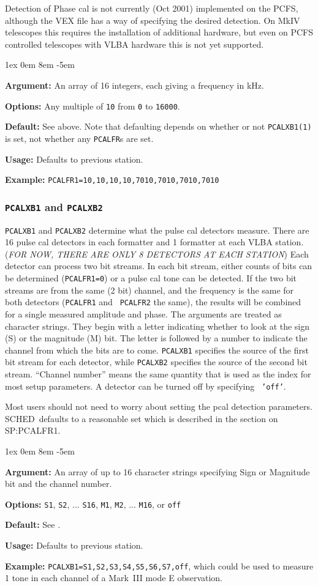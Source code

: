 \documentclass{report}
\newcommand{\schedb}{{\sc SCHED~}}
\newcommand{\rcwbox}[5]{
  \begin{list}{}{\parsep 1ex  \itemsep 0em
                 \leftmargin 8em  \itemindent -5em }
    \item {\bf Argument:} #1
    \item {\bf Options:}  #2
    \item {\bf Default:}  #3
    \item {\bf Usage:}    #4
    \item {\bf Example:}  #5
  \end{list}
}
\begin{document}
Detection of Phase cal is not currently (Oct 2001) implemented on the
PCFS, although the VEX file has a way of specifying the desired
detection.  On MkIV telescopes this requires the installation of
additional hardware, but even on PCFS controlled telescopes with VLBA
hardware this is not yet supported.

\rcwbox
{An array of 16 integers, each giving a frequency in kHz.}
{Any multiple of {\tt 10} from {\tt 0} to {\tt 16000}.}
{See above. Note that defaulting depends on whether or not {\tt PCALXB1(1)}
is set, not whether any {\tt PCALFR}s are set.}
{Defaults to previous station.}
{{\tt PCALFR1=10,10,10,10,7010,7010,7010,7010}}



\subsubsection{\label{SP:PCALXB1}{\tt PCALXB1} and {\tt PCALXB2}}

{\tt PCALXB1} and {\tt PCALXB2} determine what the pulse cal detectors
measure. There are 16 pulse cal detectors in each formatter and 1
formatter at each VLBA station. ({\em FOR NOW, THERE ARE ONLY 8
DETECTORS AT EACH STATION}) Each detector can process two bit
streams. In each bit stream, either counts of bits can be determined
({\tt PCALFR1=0}) or a pulse cal tone can be detected. If the two bit
streams are from the same (2 bit) channel, and
the frequency is the same for both detectors ({\tt PCALFR1} and {\tt
PCALFR2} the same), the results will be combined for a single measured
amplitude and phase. The arguments are treated as character
strings. They begin with a letter indicating whether to look at the
sign (S) or the magnitude (M) bit. The letter is followed by a number
to indicate the channel from which the bits are to come. {\tt PCALXB1}
specifies the source of the first bit stream for each detector, while
{\tt PCALXB2} specifies the source of the second bit stream. ``Channel
number'' means the same quantity that is used as the index for most
setup parameters. A detector can be turned off by specifying {\tt
'off'}.

Most users should not need to worry about setting the pcal detection
parameters.  \schedb defaults to a reasonable set which is
described in the section on .

\rcwbox
{An array of up to 16 character strings specifying Sign or
Magnitude bit and the channel number.}
{{\tt S1}, {\tt S2}, ... {\tt S16}, {\tt M1}, {\tt M2}, ...
{\tt M16}, or {\tt off}}
{See \htmlref{{\tt PCALFR1} and {\tt PCALFR2}}{SP:PCALFR1}.}
{Defaults to previous station.}
{{\tt PCALXB1=S1,S2,S3,S4,S5,S6,S7,off}, which could be used to
measure 1 tone in each channel of a Mark~III mode E observation.}
\end{document}
